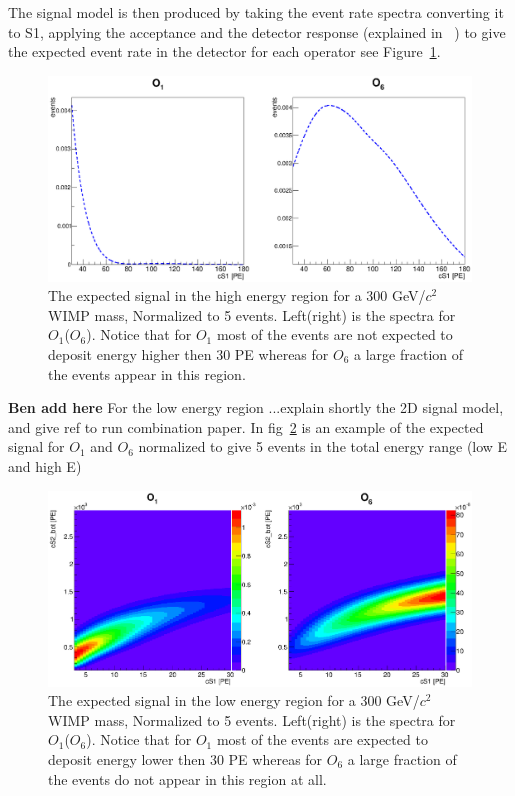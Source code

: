 The signal model is then produced by taking the event rate spectra converting it to S1, applying the acceptance and the detector response (explained in ~\cite{xe100_ana2012}) to give the expected event rate in the detector for each operator see Figure~\ref{fig:HighE}.
\begin{figure}[h!]
\begin{minipage}{1.\linewidth}
\centerline{\includegraphics[width=1.\linewidth]{Figures/SigHighO1O6.eps}}
\end{minipage}
\caption{The expected signal in the high energy region for a 300 GeV/$c^2$ WIMP mass, Normalized to 5 events. Left(right) is the spectra for $O_1$($O_6$). Notice that for $O_1$ most of the events are not expected to deposit energy higher then 30 PE whereas for $O_6$ a large fraction of the events appear in this region.}
\label{fig:HighE}
\end{figure} 




\textbf{Ben add here} For the low energy region ...explain shortly the 2D signal model, and give ref to run combination paper. In fig~\ref{fig:LowE} is an example of the expected signal for $O_1$ and $O_6$ normalized to give 5 events in the total energy range (low E and high E)
\begin{figure}[h!]
\begin{minipage}{1.\linewidth}
\centerline{\includegraphics[width=1.\linewidth]{Figures/SigLowO1O6.eps}}
\end{minipage}
\caption{The expected signal in the low energy region for a 300 GeV/$c^2$ WIMP mass, Normalized to 5 events. Left(right) is the spectra for $O_1$($O_6$). Notice that for $O_1$ most of the events are expected to deposit energy lower then 30 PE whereas for $O_6$ a large fraction of the events do not appear in this region at all.}
\label{fig:LowE}
\end{figure}





